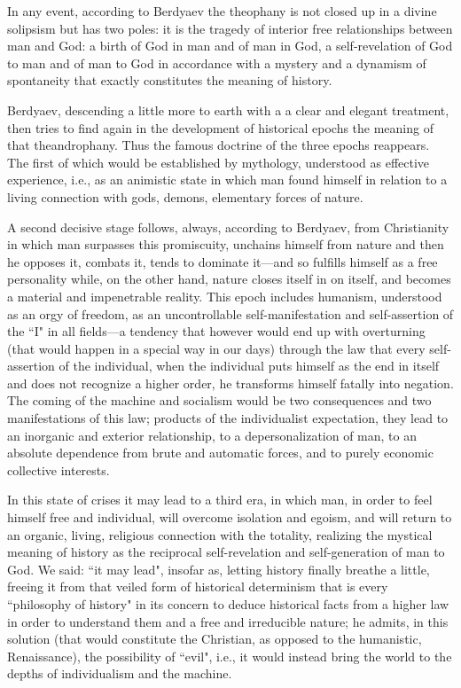 In any event, according to Berdyaev the theophany is not closed up in a divine solipsism but has two poles: it is the tragedy of interior free relationships between man and God: a birth of God in man and of man in God, a self-revelation of God to man and of man to God in accordance with a mystery and a dynamism of spontaneity that exactly constitutes the meaning of history.

Berdyaev, descending a little more to earth with a a clear and elegant treatment, then tries to find again in the development of historical epochs the meaning of that theandrophany. Thus the famous doctrine of the three epochs reappears. The first of which would be established by mythology, understood as effective experience, i.e., as an animistic state in which man found himself in relation to a living connection with gods, demons, elementary forces of nature.

A second decisive stage follows, always, according to Berdyaev, from Christianity in which man surpasses this promiscuity, unchains himself from nature and then he opposes it, combats it, tends to dominate it—and so fulfills himself as a free personality while, on the other hand, nature closes itself in on itself, and becomes a material and impenetrable reality. This epoch includes humanism, understood as an orgy of freedom, as an uncontrollable self-manifestation and self-assertion of the ``I" in all fields—a tendency that however would end up with overturning (that would happen in a special way in our days) through the law that every self-assertion of the individual, when the individual puts himself as the end in itself and does not recognize a higher order, he transforms himself fatally into negation. The coming of the machine and socialism would be two consequences and two manifestations of this law; products of the individualist expectation, they lead to an inorganic and exterior relationship, to a depersonalization of man, to an absolute dependence from brute and automatic forces, and to purely economic collective interests.

In this state of crises it may lead to a third era, in which man, in order to feel himself free and individual, will overcome isolation and egoism, and will return to an organic, living, religious connection with the totality, realizing the mystical meaning of history as the reciprocal self-revelation and self-generation of man to God. We said: ``it may lead", insofar as, letting history finally breathe a little, freeing it from that veiled form of historical determinism that is every ``philosophy of history" in its concern to deduce historical facts from a higher law in order to understand them and a free and irreducible nature; he admits, in this solution (that would constitute the Christian, as opposed to the humanistic, Renaissance), the possibility of ``evil", i.e., it would instead bring the world to the depths of individualism and the machine.

